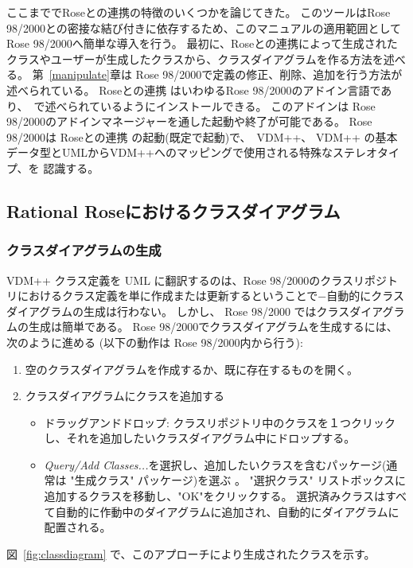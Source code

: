 \documentclass[\pformat,12pt]{jarticle}
\newcommand{\vdmpp}{VDM++}
\newcommand{\link}{Roseとの連携}
\newcommand{\rose}{Rose 98/2000}
\begin{document}
ここまでで\link{}の特徴のいくつかを論じてきた。
このツールは\rose{}との密接な結び付きに依存するため、このマニュアルの適用範囲として\rose{}へ簡単な導入を行う。
最初に、\link{}によって生成されたクラスやユーザーが生成したクラスから、クラスダイアグラムを作る方法を述べる。
第~\ref{manipulate}章は \rose{}で定義の修正、削除、追加を行う方法が述べられている。
 \link{} はいわゆる\rose{}のアドイン言語であり、~\cite{InstallPPMan-SCSK}で述べられているようにインストールできる。 
このアドインは \rose{}のアドインマネージャーを通した起動や終了が可能である。
 \rose{}は \link{} の起動(既定で起動)で、　\vdmpp{}、 \vdmpp{} の基本データ型とUMLから\vdmpp{}へのマッピングで使用される特殊なステレオタイプ、を 認識する。

\subsection{Rational Roseにおけるクラスダイアグラム} \label{diagrams}
  
\subsubsection*{クラスダイアグラムの生成}

 \vdmpp{} クラス定義を UML に翻訳するのは、\rose{}のクラスリポジトリにおけるクラス定義を単に作成または更新するということで−自動的にクラスダイアグラムの生成は行わない。
しかし、 \rose{} ではクラスダイアグラムの生成は簡単である。
 \rose{}でクラスダイアグラムを生成するには、次のように進める (以下の動作は \rose{}内から行う):


\begin{enumerate}  
\item 空のクラスダイアグラムを作成するか、既に存在するものを開く。
\item クラスダイアグラムにクラスを追加する 
\begin{itemize} 
\item ドラッグアンドドロップ: クラスリポジトリ中のクラスを１つクリックし、それを追加したいクラスダイアグラム中にドロップする。
\item  {\it Query/Add Classes...}を選択し、追加したいクラスを含むパッケージ(通常は "生成クラス" パッケージ)を選ぶ 。   
 "選択クラス" リストボックスに追加するクラスを移動し、"OK"をクリックする。
選択済みクラスはすべて自動的に作動中のダイアグラムに追加され、自動的にダイアグラムに配置される。
\end{itemize}
\end{enumerate}

図~\ref{fig:classdiagram} で、このアプローチにより生成されたクラスを示す。
\end{document}
